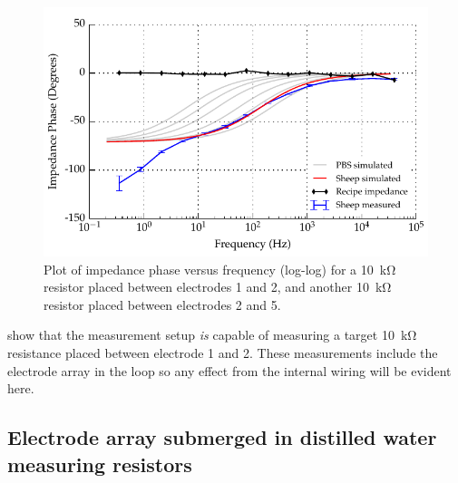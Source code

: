 \begin{figure}
    \centering
    \includegraphics{content/appendices/Solution-Impedance-Measurements/graphics/run14_calibration_10k_noWater_ZVsF_graph_phase}
    \caption{\label{fig:calibration_10kRes_phase}Plot of impedance phase versus frequency (log-log) for a \SI{10}{\kilo\ohm} resistor placed between electrodes 1 and 2, and another \SI{10}{\kilo\ohm} resistor placed between electrodes 2 and 5.}
\end{figure}

 show that the measurement setup \emph{is} capable of measuring a target \SI{10}{\kilo\ohm} resistance placed between electrode 1 and 2.
These measurements include the electrode array in the loop so any effect from the internal wiring will be evident here.


\subsection{Electrode array submerged in distilled water measuring resistors}

